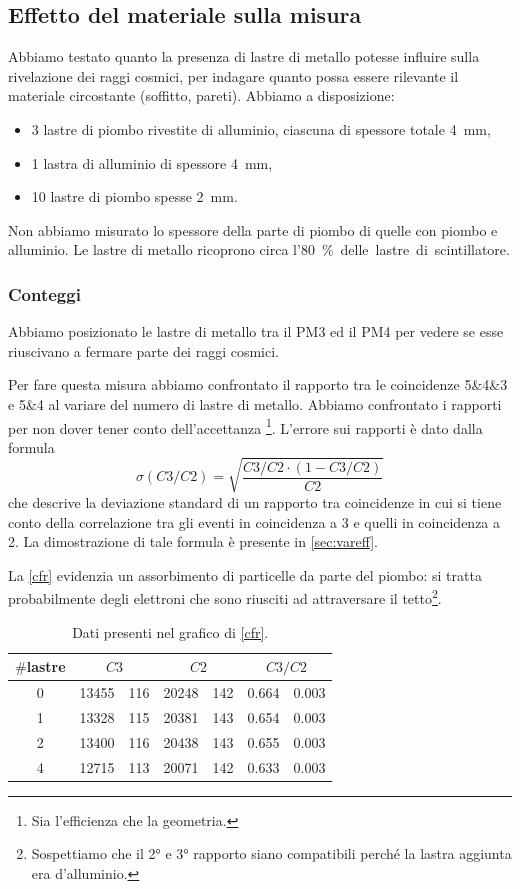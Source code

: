 \subsection{Effetto del materiale sulla misura}

Abbiamo testato quanto la presenza di lastre di metallo potesse influire sulla rivelazione dei raggi cosmici,
per indagare quanto possa essere rilevante il materiale circostante (soffitto, pareti).
Abbiamo a disposizione:
\begin{itemize}
	\item 3 lastre di piombo rivestite di alluminio, ciascuna di spessore totale \SI{4}{mm},
	\item 1 lastra di alluminio di spessore \SI{4}{mm},
	\item 10 lastre di piombo spesse \SI{2}{mm}.
\end{itemize}
Non abbiamo misurato lo spessore della parte di piombo di quelle con piombo e alluminio.
Le lastre di metallo ricoprono circa l'\SI{80}\% delle lastre di scintillatore. 

\subsubsection{Conteggi}

Abbiamo posizionato le lastre di metallo tra il PM3 ed il PM4
per vedere se esse riuscivano a fermare parte dei raggi cosmici.

Per fare questa misura abbiamo confrontato il rapporto tra le coincidenze 5\&4\&3 e 5\&4
al variare del numero di lastre di metallo.
Abbiamo confrontato i rapporti per non dover tener conto dell'accettanza%
\footnote{Sia l'efficienza che la geometria.}.
L'errore sui rapporti è dato dalla formula
$$ \sigma(C3/C2)= \sqrt{ \frac{C3/C2\cdot (1-C3/C2)}{C2} } $$
che descrive la deviazione standard di un rapporto tra coincidenze in cui si tiene conto della correlazione tra gli eventi in coincidenza a 3 e quelli in coincidenza a 2. La dimostrazione di tale formula è presente in \autoref{sec:vareff}.

La \autoref{cfr} evidenzia un assorbimento di particelle da parte del piombo: si tratta probabilmente degli elettroni che sono riusciti ad attraversare il tetto\footnote{Sospettiamo che il 2\si{\degree} e 3\si{\degree} rapporto siano compatibili perché la lastra aggiunta era d'alluminio.}.

\begin{table}
\centering
\begin{tabular}{| c | r @{\,$\pm$\,} l | r @{\,$\pm$\,} l | r @{\,$\pm$\,} l |}
\hline
$\#$lastre & \multicolumn{2}{c|}{$C3$} & \multicolumn{2}{c|}{$C2$} & \multicolumn{2}{c|}{$C3/C2$} \\ 
\hline
0 & 13455&116 & 20248&142 & 0.664&0.003 \\
1 & 13328&115 & 20381&143 & 0.654&0.003 \\
2 & 13400&116 & 20438&143 & 0.655&0.003 \\
4 & 12715&113 & 20071&142 & 0.633&0.003 \\
\hline
\end{tabular}
\caption{Dati presenti nel grafico di \autoref{cfr}.}
\label{dati cfr}
\end{table}


